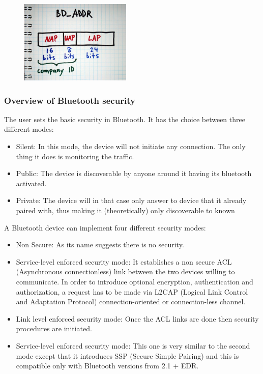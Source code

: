 \begin{figure}[!h]
  \begin{center}
	\includegraphics[width=200px]{images/bd_addr.jpg}
	\label{Bluetooth address}
  \end{center}
\end{figure}

\subsubsection{Overview of Bluetooth security}

The user sets the basic security in Bluetooth. It has the choice between three different modes:
 \begin{itemize}
 	\item Silent: In this mode, the device will not initiate any connection. The only thing it does is monitoring the traffic.
 	\item Public: The device is discoverable by anyone around it having its bluetooth activated.
 	\item Private: The device will in that case only answer to device that it already paired with, thus making it (theoretically) only discoverable to known 
 \end{itemize}

A Bluetooth device can implement four different security modes:
  \begin{itemize}
  	\item Non Secure: As its name suggests there is no security.
  	\item Service-level enforced security mode: It establishes a non secure ACL (Asynchronous connectionless) 	link between the two devices willing to communicate. In order to introduce optional encryption, authentication and authorization, a request has to be made via L2CAP (Logical Link Control and Adaptation Protocol) connection-oriented or connection-less channel.
  	\item Link level enforced security mode: Once the ACL links are done then security procedures are initiated.
  	\item Service-level enforced security mode: This one is very similar to the second mode except that it introduces SSP (Secure Simple Pairing) and this is compatible only with Bluetooth versions from 2.1 + EDR.
  \end{itemize}
  

